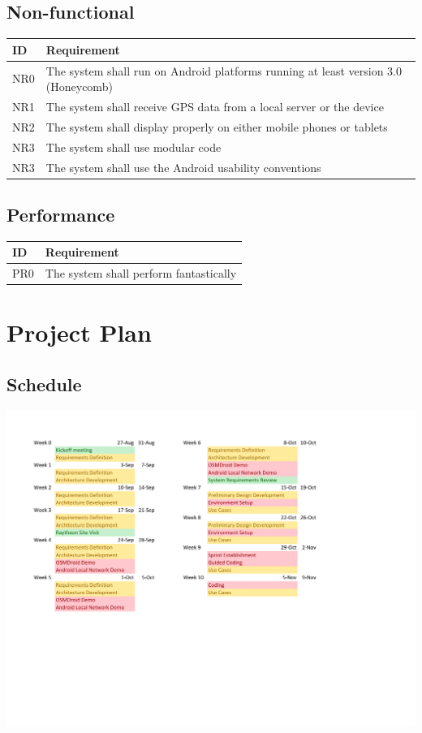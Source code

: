 \documentclass{article}
\begin{document}
\subsection{Non-functional}

\begin{tabular}{ | p{.5in} | p{5in} | }
\hline
\textbf{ID} & \textbf{Requirement}\\
\hline
\hline
NR0 & The system shall run on Android platforms running at least version 3.0 (Honeycomb)\\
\hline
NR1 & The system shall receive GPS data from a local server or the device\\
\hline
NR2 & The system shall display properly on either mobile phones or tablets\\
\hline
NR3 & The system shall use modular code\\
\hline
NR3 & The system shall use the Android usability conventions\\
\hline
\end{tabular}

\subsection{Performance}

\begin{tabular}{ | p{.5in} | p{5in} | }
\hline
\textbf{ID} & \textbf{Requirement}\\
\hline
\hline
PR0 & The system shall perform fantastically\\
\hline
\end{tabular}


\section{Project Plan}
\subsection{Schedule}
\includegraphics[keepaspectratio, width=8in]{Schedule/FallSchedule.pdf} \\
\end{document}
